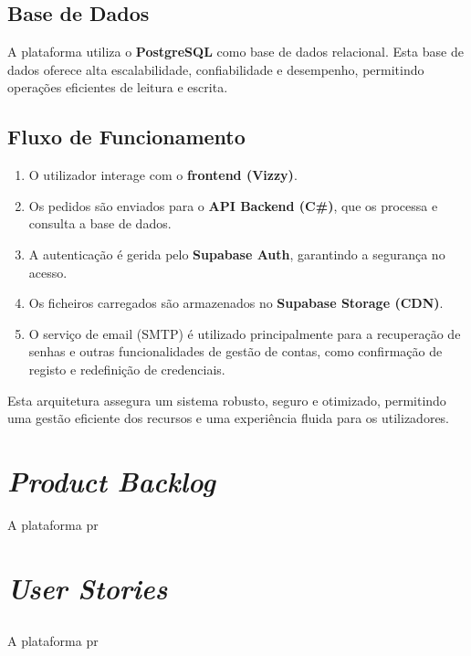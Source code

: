 \documentclass[a4paper, 12pt]{article} %
\begin{document}
\subsection{Base de Dados}
A plataforma utiliza o \textbf{PostgreSQL} como base de dados relacional. Esta base de dados oferece alta escalabilidade, confiabilidade e desempenho, permitindo operações eficientes de leitura e escrita.

\subsection{Fluxo de Funcionamento}
\begin{enumerate}
	\item O utilizador interage com o \textbf{frontend (Vizzy)}.
	\item Os pedidos são enviados para o \textbf{API Backend (C\#)}, que os processa e consulta a base de dados.
	\item A autenticação é gerida pelo \textbf{Supabase Auth}, garantindo a segurança no acesso.
	\item Os ficheiros carregados são armazenados no \textbf{Supabase Storage (CDN)}.
	\item O serviço de email (SMTP) é utilizado principalmente para a recuperação de senhas e outras funcionalidades de gestão de contas, como confirmação de registo e redefinição de credenciais.
\end{enumerate}

Esta arquitetura assegura um sistema robusto, seguro e otimizado, permitindo uma gestão eficiente dos recursos e uma experiência fluida para os utilizadores.

\newpage
\section*{\textit{Product Backlog}}

A plataforma pr

\newpage
\section*{\textit{User Stories}}
\subsection{}
A plataforma pr

\newpage
\end{document}
